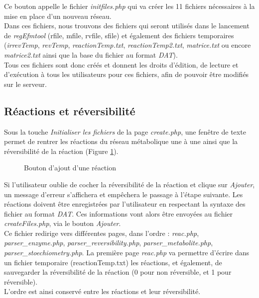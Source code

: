 Ce bouton appelle le fichier \emph{initfiles.php} qui va créer les 11 fichiers nécessaires à la mise en place d'un nouveau réseau.\\
Dans ces fichiers, nous trouvons des fichiers qui seront utilisés dans le lancement de \emph{regEfmtool} (rfile, mfile, rvfile, sfile) et également des fichiers temporaires (\emph{irrevTemp}, \emph{revTemp}, \emph{reactionTemp.txt}, \emph{reactionTemp2.txt}, \emph{matrice.txt} ou encore \emph{matrice2.txt} ainsi que la base du fichier au format \emph{DAT}).\\
Tous ces fichiers sont donc créés et donnent les droits d'édition, de lecture et d'exécution à tous les utilisateurs pour ces fichiers, afin de pouvoir être modifiés sur le serveur.

\subsection{Réactions et réversibilité}
Sous la touche \emph{Initialiser les fichiers} de la page \emph{create.php}, une fenêtre de texte permet de rentrer les réactions du réseau métabolique une à une ainsi que la réversibilité de la réaction (Figure \ref{boutonAjout}). 

\begin{figure}[!ht]
	\begin{center}
		\caption{Bouton d'ajout d'une réaction}
  		\label{boutonAjout}
  	\end{center}	
\end{figure}

Si l'utilisateur oublie de cocher la réversibilité de la réaction et clique sur \emph{Ajouter}, un message d'erreur s'affichera et empêchera le passage à l'étape suivante. Les réactions doivent être enregistrées par l'utilisateur en respectant la syntaxe des fichier au format \emph{DAT}. Ces informations vont alors être envoyées au fichier \emph{createFiles.php}, via le bouton \emph{Ajouter}.\\
Ce fichier redirige vers différentes pages, dans l'ordre : \emph{reac.php}, \emph{parser\_enzyme.php}, \emph{parser\_reversibility.php}, \emph{parser\_metabolite.php}, \emph{parser\_stoechiometry.php}.
La première page \emph{reac.php} va permettre d'écrire dans un fichier temporaire (reactionTemp.txt) les réactions, et également, de sauvegarder la réversibilité de la réaction (0 pour non réversible, et 1 pour réversible).\\
L'ordre est ainsi conservé entre les réactions et leur réversibilité.

